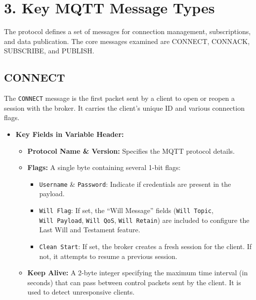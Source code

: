 \documentclass[a4paper, 12pt]{book} %
\begin{document}
\section{3. Key MQTT Message Types}\label{key-mqtt-message-types}

The protocol defines a set of messages for connection management,
subscriptions, and data publication. The core messages examined are
CONNECT, CONNACK, SUBSCRIBE, and PUBLISH.

\subsection{CONNECT}\label{connect}

The \texttt{CONNECT} message is the first packet sent by a client to
open or reopen a session with the broker. It carries the client's unique
ID and various connection flags.

\begin{itemize}
\tightlist
\item
  \textbf{Key Fields in Variable Header:}

  \begin{itemize}
  \tightlist
  \item
    \textbf{Protocol Name \& Version:} Specifies the MQTT protocol
    details.
  \item
    \textbf{Flags:} A single byte containing several 1-bit flags:

    \begin{itemize}
    \tightlist
    \item
      \texttt{Username} \& \texttt{Password}: Indicate if credentials
      are present in the payload.
    \item
      \texttt{Will\ Flag}: If set, the ``Will Message'' fields
      (\texttt{Will\ Topic}, \texttt{Will\ Payload}, \texttt{Will\ QoS},
      \texttt{Will\ Retain}) are included to configure the Last Will and
      Testament feature.
    \item
      \texttt{Clean\ Start}: If set, the broker creates a fresh session
      for the client. If not, it attempts to resume a previous session.
    \end{itemize}
  \item
    \textbf{Keep Alive:} A 2-byte integer specifying the maximum time
    interval (in seconds) that can pass between control packets sent by
    the client. It is used to detect unresponsive clients.
  \end{itemize}
\end{itemize}
\end{document}
